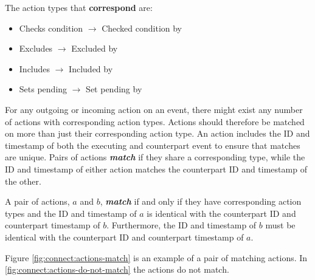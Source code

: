 	\begin{definition}
		\label{def:happensbeforeaction}
		The action types that \textbf{correspond} are:
			\begin{itemize}
				\item Checks condition $\rightarrow$ Checked condition by
                \item Excludes $\rightarrow$ Excluded by
				\item Includes $\rightarrow$ Included by
				\item Sets pending $\rightarrow$ Set pending by
			\end{itemize}
	\end{definition}
	
	\noindent For any outgoing or incoming action on an event, there might exist any number of actions with corresponding action types. Actions should therefore be matched on more than just their corresponding action type. An action includes the ID and timestamp of both the executing and counterpart event to ensure that matches are unique.
    Pairs of actions \textbf{\textit{match}} if they share a corresponding type, while the ID and timestamp of either action matches the counterpart ID and timestamp of the other.
    
    \begin{definition}
    	\label{def:action:matching}
    	A pair of actions, $a$ and $b$, \textit{\textbf{match}} if and only if they have corresponding action types and the ID and timestamp of $a$ is identical with the counterpart ID and counterpart timestamp of $b$. Furthermore, the ID and timestamp of $b$ must be identical with the counterpart ID and counterpart timestamp of $a$.
    \end{definition}
    
    \noindent Figure \ref{fig:connect:actions-match} is an example of a pair of matching actions.  In \autoref{fig:connect:actions-do-not-match} the actions do not match.
    
